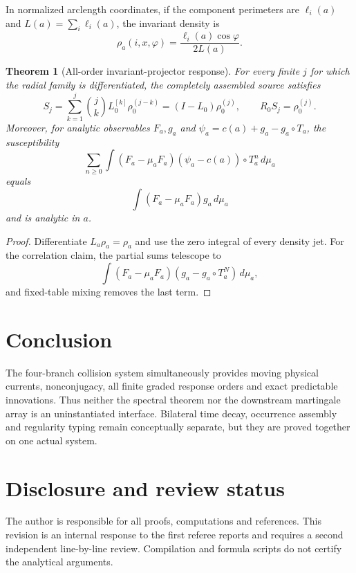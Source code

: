 \documentclass[11pt,reqno]{amsart}
\newtheorem{theorem}{Theorem}[section]
\theoremstyle{definition}
\theoremstyle{remark}
\begin{document}
In normalized arclength coordinates, if the component perimeters are
$\ell_i(a)$ and $L(a)=\sum_i\ell_i(a)$, the invariant density is
\[
 \rho_a(i,x,\varphi)=\frac{\ell_i(a)\cos\varphi}{2L(a)}.
\]

\begin{theorem}[All-order invariant-projector response]\label{thm:specular}
For every finite $j$ for which the radial family is differentiated, the
completely assembled source satisfies
\[
 S_j=\sum_{k=1}^j{j\choose k}L_0^{[k]}
 \rho_0^{(j-k)}=(I-L_0)\rho_0^{(j)},
 \qquad R_0S_j=\rho_0^{(j)}.
\]
Moreover, for analytic observables $F_a,g_a$ and
$\psi_a=c(a)+g_a-g_a\circ T_a$, the susceptibility
\[
 \sum_{n\ge0}\int(F_a-\mu_aF_a)
 (\psi_a-c(a))\circ T_a^n\,d\mu_a
\]
equals
\[
 \int(F_a-\mu_aF_a)g_a\,d\mu_a
\]
and is analytic in $a$.
\end{theorem}

\begin{proof}
Differentiate $L_a\rho_a=\rho_a$ and use the zero integral of every density
jet.  For the correlation claim, the partial sums telescope to
\[
 \int(F_a-\mu_aF_a)(g_a-g_a\circ T_a^N)\,d\mu_a,
\]
and fixed-table mixing removes the last term.
\end{proof}

\section{Conclusion}

The four-branch collision system simultaneously provides moving physical
currents, nonconjugacy, all finite graded response orders and exact predictable
innovations.  Thus neither the spectral theorem nor the downstream martingale
array is an uninstantiated interface.  Bilateral time decay, occurrence
assembly and regularity typing remain conceptually separate, but they are
proved together on one actual system.

\section*{Disclosure and review status}
The author is responsible for all proofs, computations and references.  This
revision is an internal response to the first referee reports and requires a
second independent line-by-line review.  Compilation and formula scripts do
not certify the analytical arguments.



\end{document}
